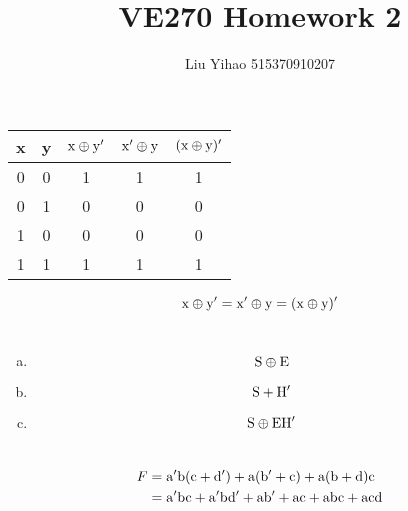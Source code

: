 \documentclass{article}
\title{VE270 Homework 2}
\author{Liu Yihao 515370910207}
\date{}
\begin{document}
\maketitle

\section{}
\begin{center}
\begin{tabular}{cc|ccc}
x&y&$\rm x\oplus y'$&$\rm x'\oplus y$&$\rm(x \oplus y)'$\\
\hline
0&0&1&1&1\\
0&1&0&0&0\\
1&0&0&0&0\\
1&1&1&1&1\\
\end{tabular}
\end{center}
$$\rm x\oplus y'=x'\oplus y=(x\oplus y)'$$

\section{}
\begin{enumerate}[(a)]
\item $$\rm S\oplus E$$
\item $$\rm S+H'$$
\item $$\rm S\oplus EH'$$
\end{enumerate}

\section{}
\begin{align*}
F&=\rm a'b(c+d')+a(b'+c)+a(b+d)c\\
&=\rm a'bc+a'bd'+ab'+ac+abc+acd\\
\end{align*}
\end{document}

